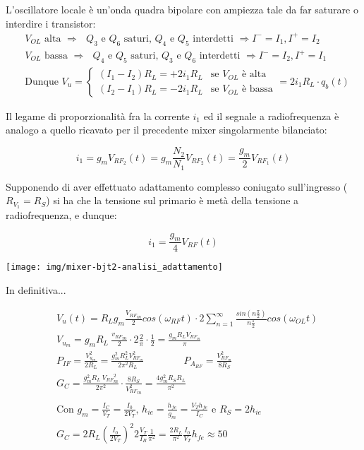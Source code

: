 L'oscillatore locale è un'onda quadra bipolare con ampiezza tale da far saturare o interdire i transistor:
\begin{align*}
&V_{OL} \mbox{ alta } \Rightarrow \mbox{ $Q_3$ e $Q_6$ saturi, $Q_4$ e $Q_5$ interdetti } \Rightarrow I^- = I_1, I^+ = I_2\\
&V_{OL} \mbox{ bassa } \Rightarrow \mbox{ $Q_4$ e $Q_5$ saturi, $Q_3$ e $Q_6$ interdetti } \Rightarrow I^- = I_2, I^+ = I_1\\
&\mbox{Dunque } V_u = \begin{cases}
(I_1 - I_2) R_L = + 2 i_1 R_L & \mbox{se $V_{OL}$ è alta}
\\
(I_2 - I_1) R_L = - 2 i_1 R_L & \mbox{se $V_{OL}$ è bassa}
\end{cases}
= 2 i_1 R_L \cdot q_b(t)
\end{align*}


\begin{multicols}{2}

Il legame di proporzionalità fra la corrente $i_1$ ed il segnale a radiofrequenza è analogo a quello ricavato per il precedente mixer singolarmente bilanciato:

$$i_1 = g_m V_{RF_2}(t) = g_m \frac{N_2}{N_1} V_{RF_2}(t)
= \frac{g_m}{2} V_{RF_1}(t)$$

Supponendo di aver effettuato adattamento complesso coniugato sull'ingresso ($R_{V_1} = R_S$) si ha che la tensione sul primario è metà della tensione a radiofrequenza, e dunque:

$$i_1 = \frac{g_m}{4} V_{RF}(t)$$

\columnbreak
\null \vfill
\texttt{[image: img/mixer-bjt2-analisi\_adattamento]}
\vfill \null 

\end{multicols}

In definitiva...

\begin{align*}
&V_u(t) = R_L g_m \frac{{V_{RF}}_m}{2} cos(\omega_{RF}t) \cdot 2\sum_{n=1}^{\infty} \frac{sin(n\frac{\pi}{2})}{n\frac{\pi}{2}} cos(\omega_{OL} t)\\
&{V_{u_m}} = g_m R_L ~ \frac{{v_{RF}}_m}{2} \cdot 2 \frac{2}{\pi} \cdot \frac{1}{2} = \frac{g_m R_L V_{{RF}_m}}{\pi}\\
&P_{IF} = \frac{V_{u_m}^2}{2 R_L} =
\frac{g_m^2 R_L^2 V_{{RF}_m}^2}{2 \pi^2 R_L}
\qquad\qquad
P_{A_{RF}} = \frac{V_{{RF}_m}^2}{8 R_S} \\
&G_C = \frac{g_m^2 R_L ~ {V_{RF}}_m^2}{2\pi^2} \cdot \frac{8 R_S}{{V^2_{RF}}_m} =
\frac{4 g_m^2 R_S R_L }{\pi^2}
\\\\
&\mbox{Con $g_m = \frac{I_C}{V_T} = \frac{I_0}{2 V_T}$, $h_{ie} = \frac{h_{fe}}{g_m} = \frac{V_T h_{fe}}{I_C}$ e $R_S = 2h_{ie}$}
\\
&G_C = 2 R_L \left(\frac{I_0}{2V_T}\right)^2
2 \frac{V_T}{I_B} \frac{1}{\pi^2}=
\frac{2R_L}{\pi^2} \frac{I_0}{V_T} h_{fe} \approx 50
\end{align*}

